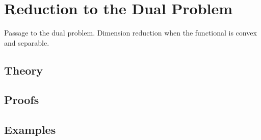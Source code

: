
\section{Reduction to the Dual Problem}
\label{sec:2.4.13-dual-problem-reduction}

\begin{ticket}
Passage to the dual problem. Dimension reduction when the functional is convex and separable.
\end{ticket}

\subsection*{Theory}

\subsection*{Proofs}

\subsection*{Examples}
